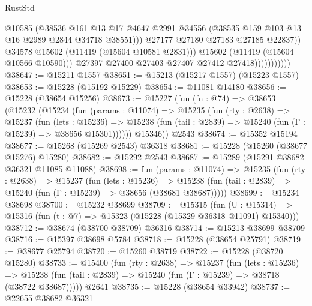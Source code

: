 \begin{lexlean}{RustStd}
\begin{coremodule}
                                    @10585
                                    (@38536
                                      @161
                                      @13
                                      @17
                                      @4647
                                      @2991
                                      @34556
                                      (@38535 @159 @103 @13 @16 @2989 @2844 @34718 @38551)))
                                  @27177
                                  @27180
                                  @27183
                                  @27185
                                  @22837))
                              @34578
                              @15602
                              (@11419 (@15604 @10581 @2831)))
                            @15602
                            (@11419 (@15604 @10566 @10590)))
                          @27397
                          @27400
                          @27403
                          @27407
                          @27412
                          @27418)))))))))))
@38647 := @15211 @1557
@38651 := @15213 (@15217 @1557) (@15223 @1557)
@38653 := @15228 (@15192 @15229)
@38654 := @11081 @14180
@38656 := @15228 (@38654 @15256)
@38673 := @15227
    (fun (fn : @74) =>
    @38653
      (@15232
        (@15234
          (fun (params : @11074) =>
          @15235
            (fun (rty : @2638) =>
            @15237
              (fun (lets : @15236) =>
              @15238 (fun (tail : @2839) => @15240 (fun (Γ : @15239) => @38656 @15301))))))
        @15346))
    @2543
@38674 := @15352 @15194
@38677 := @15268 (@15269 @2543) @36318
@38681 := @15228 (@15260 (@38677 @15276) @15280)
@38682 := @15292 @2543
@38687 := @15289 (@15291 @38682 @36321 @11085 @11088)
@38698 := fun (params : @11074) =>
  @15235
    (fun (rty : @2638) =>
    @15237
      (fun (lets : @15236) =>
      @15238 (fun (tail : @2839) => @15240 (fun (Γ : @15239) => @38656 (@38681 @38687)))))
@38699 := @15234 @38698
@38700 := @15232 @38699
@38709 := @15315
    (fun (U : @15314) => @15316 (fun (t : @7) => @15323 (@15228 (@15329 @36318 @11091) @15340)))
@38712 := @38674 (@38700 @38709) @36316
@38714 := @15213 @38699 @38709
@38716 := @15397 @38698 @5784
@38718 := @15228 (@38654 @25791)
@38719 := @38677 @25794
@38720 := @15260 @38719
@38722 := @15228 (@38720 @15280)
@38733 := @15400
    (fun (rty : @2638) =>
    @15237
      (fun (lets : @15236) =>
      @15238 (fun (tail : @2839) => @15240 (fun (Γ : @15239) => @38718 (@38722 @38687)))))
    @2641
@38735 := @15228 (@38654 @33942)
@38737 := @22655 @38682 @36321

\end{coremodule}
\end{lexlean}
